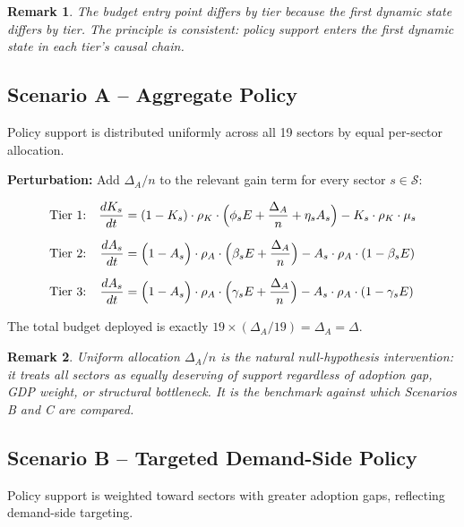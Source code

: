 \documentclass[11pt,a4paper]{article}
\newtheorem{remark}{Remark}
\begin{document}
\begin{remark}
The budget entry point differs by tier because the first dynamic state differs by tier. The principle is consistent: policy support enters the \emph{first} dynamic state in each tier's causal chain.
\end{remark}

\subsection{Scenario A -- Aggregate Policy}

Policy support is distributed uniformly across all 19 sectors by equal per-sector allocation.

\textbf{Perturbation:} Add $\Delta_A / n$ to the relevant gain term for every sector $s \in \mathcal{S}$:

\begin{equation}
\begin{aligned}
&\text{Tier 1:} &\frac{dK_s}{dt} &= (1 - K_s)\cdot\rho_K\cdot\Bigl(\phi_s E + \frac{\Delta_A}{n} + \eta_s A_s\Bigr) - K_s\cdot\rho_K\cdot\mu_s \\[6pt]
&\text{Tier 2:} &\frac{dA_s}{dt} &= \Bigl(1 - A_s\Bigr)\cdot\rho_A\cdot\Bigl(\beta_s E + \frac{\Delta_A}{n}\Bigr) - A_s\cdot\rho_A\cdot(1 - \beta_s E) \\[6pt]
&\text{Tier 3:} &\frac{dA_s}{dt} &= \Bigl(1 - A_s\Bigr)\cdot\rho_A\cdot\Bigl(\gamma_s E + \frac{\Delta_A}{n}\Bigr) - A_s\cdot\rho_A\cdot(1 - \gamma_s E)
\end{aligned}
\label{eq:scenA}
\end{equation}

The total budget deployed is exactly $19 \times (\Delta_A / 19) = \Delta_A = \Delta$.

\begin{remark}
Uniform allocation $\Delta_A / n$ is the natural null-hypothesis intervention: it treats all sectors as equally deserving of support regardless of adoption gap, GDP weight, or structural bottleneck. It is the benchmark against which Scenarios B and C are compared.
\end{remark}

\subsection{Scenario B -- Targeted Demand-Side Policy}

Policy support is weighted toward sectors with greater adoption gaps, reflecting demand-side targeting.
\end{document}
